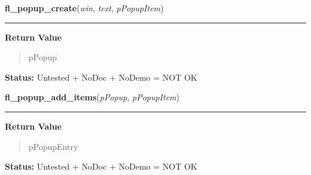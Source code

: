     \label{xformslib:library:fl_popup_create}

    \vspace{0.5ex}

\hspace{.8\funcindent}\begin{boxedminipage}{\funcwidth}

    \raggedright \textbf{fl\_popup\_create}(\textit{win}, \textit{text}, \textit{pPopupItem})

    \vspace{-1.5ex}

    \rule{\textwidth}{0.5\fboxrule}
\setlength{\parskip}{2ex}
\setlength{\parskip}{1ex}
      \textbf{Return Value}
    \vspace{-1ex}

      \begin{quote}
      pPopup

      \end{quote}

\textbf{Status:} Untested + NoDoc + NoDemo = NOT OK



    \end{boxedminipage}

    \label{xformslib:library:fl_popup_add_items}

    \vspace{0.5ex}

\hspace{.8\funcindent}\begin{boxedminipage}{\funcwidth}

    \raggedright \textbf{fl\_popup\_add\_items}(\textit{pPopup}, \textit{pPopupItem})

    \vspace{-1.5ex}

    \rule{\textwidth}{0.5\fboxrule}
\setlength{\parskip}{2ex}
\setlength{\parskip}{1ex}
      \textbf{Return Value}
    \vspace{-1ex}

      \begin{quote}
      pPopupEntry

      \end{quote}

\textbf{Status:} Untested + NoDoc + NoDemo = NOT OK



    \end{boxedminipage}

